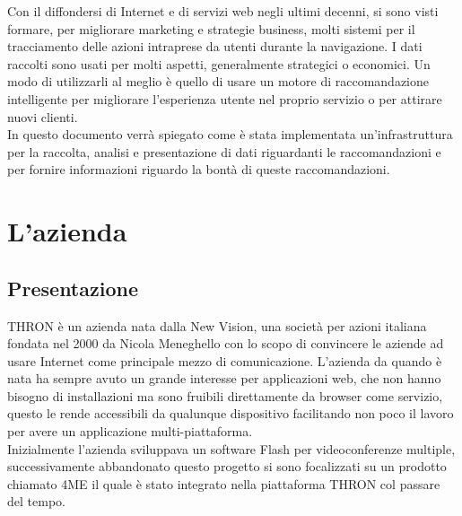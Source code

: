 \documentclass[a4paper, 12pt, twoside, openright]{book}
\newenvironment{abstract}{\cleardoublepage \null \vfill \begin{center}\bfseries\abstractname \end{center}}{\vfill\null}
\begin{document}
\begingroup %
  \makeatletter
  \let\ps@plain\ps@empty
  \makeatother
  \tableofcontents
  \listoffigures
  \clearpage
\endgroup

\begin{abstract} %
 \markboth{}{} %
 \thispagestyle{empty}
 Con il diffondersi di Internet e di servizi web negli ultimi decenni, si sono visti formare, per migliorare marketing e strategie business, molti sistemi per il tracciamento delle azioni intraprese da utenti durante la navigazione. I dati raccolti sono usati per molti aspetti, generalmente strategici o economici. Un modo di utilizzarli al meglio è quello di usare un motore di raccomandazione intelligente per migliorare l'esperienza utente nel proprio servizio o per attirare nuovi clienti.\\
 In questo documento verrà spiegato come è stata implementata un'infrastruttura per la raccolta, analisi e presentazione di dati riguardanti le raccomandazioni e per fornire informazioni riguardo la bontà di queste raccomandazioni. 
\end{abstract}

\mainmatter

\cfoot{}
	\hypersetup{linkcolor = blue}

\chapter{L'azienda} %

\section{Presentazione}
THRON è un azienda nata dalla New Vision, una società per azioni italiana fondata nel 2000 da Nicola Meneghello con lo scopo di convincere le aziende ad usare Internet come principale mezzo di comunicazione. L'azienda da quando è nata ha sempre avuto un grande interesse per applicazioni web, che non hanno bisogno di installazioni ma sono fruibili direttamente da browser come servizio, questo le rende accessibili da qualunque dispositivo facilitando non poco il lavoro per avere un applicazione multi-piattaforma.\\

Inizialmente l'azienda sviluppava un software Flash per videoconferenze multiple, successivamente abbandonato questo progetto si sono focalizzati su un prodotto chiamato 4ME il quale è stato integrato nella piattaforma THRON col passare del tempo.\\
\end{document}
